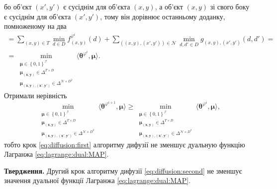 бо об'єкт $\left(x', y' \right)$ є сусіднім для об'єкта $\left(x, y \right)$,
а об'єкт $\left(x, y \right)$ зі свого боку є сусіднім для об'єкта
$\left(x', y' \right)$, тому він дорівнює останньому доданку, помноженому на два
\begin{equation*}
\begin{gathered}
    = \sum \limits_{\left(x, y \right) \in T}
        \min \limits_{d \in D}
            f_{\left(x, y \right)}^{\varphi^i} \left( d \right) +
    \sum \limits_{\left(\left(x, y \right), \left(x', y' \right) \right) \in \mathcal{N}}
        \min \limits_{d, d' \in D}
            g_{\left(x, y \right), \left(x', y' \right)} \left( d, d' \right) = \\
    = \min \limits_{\substack{\pmb{\mu} \in \left\{ 0, 1 \right\}^{\mathcal{I}} \\
                            \pmb{\mu_{\left(x, y \right)}} \in \Delta^{T \times D} \\
                            \pmb{\mu_{\left(x, y \right), \left(x', y' \right)}} \in
                                \Delta^{\mathcal{N} \times D^2}}}
        \langle \pmb{\theta}^{\varphi^i}, \pmb{\mu} \rangle.
\end{gathered}
\end{equation*}
Отримали нерівність
\begin{equation*}
    \min \limits_{\substack{\pmb{\mu} \in \left\{ 0, 1 \right\}^{\mathcal{I}} \\
                            \pmb{\mu_{\left(x, y \right)}} \in \Delta^{T \times D} \\
                            \pmb{\mu_{\left(x, y \right), \left(x', y' \right)}} \in
                                \Delta^{\mathcal{N} \times D^2}}}
        \langle \pmb{\theta}^{\varphi^{i + 1}}, \pmb{\mu} \rangle \ge
    \min \limits_{\substack{\pmb{\mu} \in \left\{ 0, 1 \right\}^{\mathcal{I}} \\
                            \pmb{\mu_{\left(x, y \right)}} \in \Delta^{T \times D} \\
                            \pmb{\mu_{\left(x, y \right), \left(x', y' \right)}} \in
                                \Delta^{\mathcal{N} \times D^2}}}
        \langle \pmb{\theta}^{\varphi^i}, \pmb{\mu} \rangle,
\end{equation*}
тобто крок \eqref{eq:diffusion:first}
алгоритму дифузії не зменшує дуальную функцію Лагранжа \eqref{eq:lagrange:dual:MAP}.

\textbf{Твердження.}
Другий крок алгоритму дифузії \eqref{eq:diffusion:second}
не зменшує значення дуальної функції Лагранжа \eqref{eq:lagrange:dual:MAP}.


